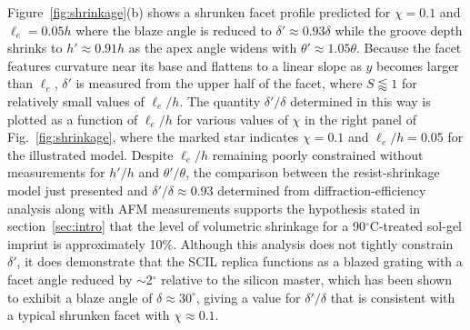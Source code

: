 \documentclass{osa-article}
\begin{document}
Figure~\ref{fig:shrinkage}(b) shows a shrunken facet profile predicted for $\chi = 0.1$ and $\ell_e = 0.05 h$ where the blaze angle is reduced to $\delta' \approx 0.93 \delta $ while the groove depth shrinks to $h' \approx 0.91 h$ as the apex angle widens with $\theta' \approx 1.05 \theta$. 
Because the facet features curvature near its base and flattens to a linear slope as $y$ becomes larger than $\ell_e$, $\delta'$ is measured from the upper half of the facet, where $S \lessapprox 1$ for relatively small values of $\ell_e / h$. 
The quantity $\delta' / \delta$ determined in this way is plotted as a function of $\ell_e / h$ for various values of $\chi$ in the right panel of Fig.~\ref{fig:shrinkage}, where the marked star indicates $\chi = 0.1$ and $\ell_e / h = 0.05$ for the illustrated model. 
Despite $\ell_e / h$ remaining poorly constrained without measurements for $h'/h$ and $\theta' / \theta$, the comparison between the resist-shrinkage model just presented and $\delta' / \delta \approx 0.93$ determined from diffraction-efficiency analysis along with AFM measurements supports the hypothesis stated in section~\ref{sec:intro} that the level of volumetric shrinkage for a 90$^{\circ}$C-treated sol-gel imprint is approximately 10\%. 
Although this analysis does not tightly constrain $\delta'$, it does demonstrate that the SCIL replica functions as a blazed grating with a facet angle reduced by $\sim$2$^{\circ}$ relative to the silicon master, which has been shown to exhibit a blaze angle of $\delta \approx 30^{\circ}$, giving a value for $\delta' / \delta$ that is consistent with a typical shrunken facet with $\chi \approx 0.1$. 
\end{document}
